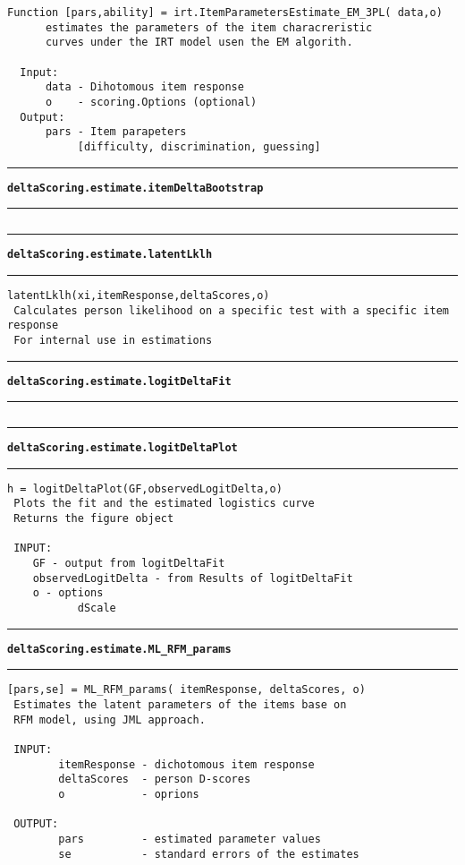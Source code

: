 \begin{lstlisting}[style=Matlab-bw]
  Function [pars,ability] = irt.ItemParametersEstimate_EM_3PL( data,o)
      estimates the parameters of the item characreristic
      curves under the IRT model usen the EM algorith.

  Input:
      data - Dihotomous item response
      o    - scoring.Options (optional)
  Output:
      pars - Item parapeters
           [difficulty, discrimination, guessing]
\end{lstlisting}
\par\noindent\rule{\textwidth}{0.4pt}
{\bf\tt deltaScoring.estimate.itemDeltaBootstrap}
\par\noindent\rule{\textwidth}{0.4pt}
\begin{lstlisting}[style=Matlab-bw]
\end{lstlisting}
\par\noindent\rule{\textwidth}{0.4pt}
{\bf\tt deltaScoring.estimate.latentLklh}
\par\noindent\rule{\textwidth}{0.4pt}
\begin{lstlisting}[style=Matlab-bw]
 latentLklh(xi,itemResponse,deltaScores,o)
 Calculates person likelihood on a specific test with a specific item response
 For internal use in estimations
\end{lstlisting}
\par\noindent\rule{\textwidth}{0.4pt}
{\bf\tt deltaScoring.estimate.logitDeltaFit}
\par\noindent\rule{\textwidth}{0.4pt}
\begin{lstlisting}[style=Matlab-bw]
\end{lstlisting}
\par\noindent\rule{\textwidth}{0.4pt}
{\bf\tt deltaScoring.estimate.logitDeltaPlot}
\par\noindent\rule{\textwidth}{0.4pt}
\begin{lstlisting}[style=Matlab-bw]
 h = logitDeltaPlot(GF,observedLogitDelta,o)
 Plots the fit and the estimated logistics curve
 Returns the figure object

 INPUT:
    GF - output from logitDeltaFit
    observedLogitDelta - from Results of logitDeltaFit
    o - options
           dScale
\end{lstlisting}
\par\noindent\rule{\textwidth}{0.4pt}
{\bf\tt deltaScoring.estimate.ML\_RFM\_params}
\par\noindent\rule{\textwidth}{0.4pt}
\begin{lstlisting}[style=Matlab-bw]
 [pars,se] = ML_RFM_params( itemResponse, deltaScores, o)
 Estimates the latent parameters of the items base on 
 RFM model, using JML approach.

 INPUT: 
		itemResponse - dichotomous item response
		deltaScores  - person D-scores	
		o            - oprions 

 OUTPUT:
		pars         - estimated parameter values
		se           - standard errors of the estimates
\end{lstlisting}
